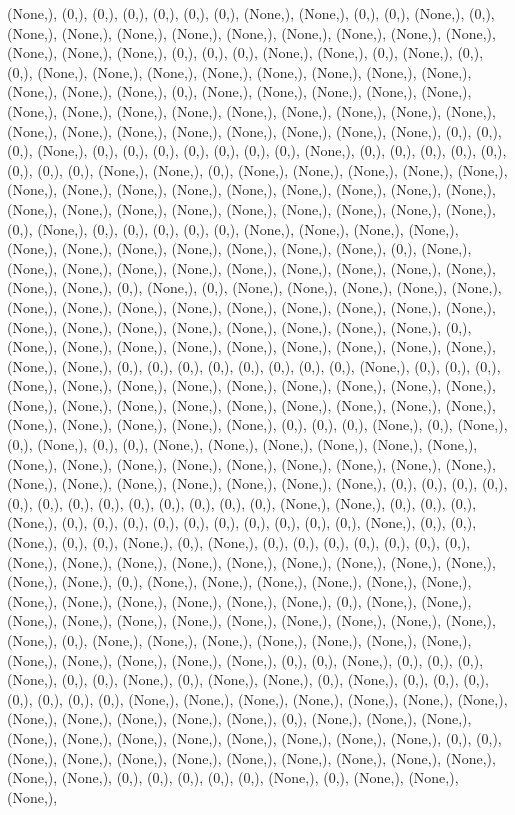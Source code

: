 \documentclass{article}
\begin{document}
(None,), (0,), (0,), (0,), (0,), (0,), (0,), (None,), (None,), (0,), (0,), (None,), (0,), (None,), (None,), (None,), (None,), (None,), (None,), (None,), (None,), (None,), (None,), (None,), (None,), (0,), (0,), (0,), (None,), (None,), (0,), (None,), (0,), (0,), (None,), (None,), (None,), (None,), (None,), (None,), (None,), (None,), (None,), (None,), (None,), (0,), (None,), (None,), (None,), (None,), (None,), (None,), (None,), (None,), (None,), (None,), (None,), (None,), (None,), (None,), (None,), (None,), (None,), (None,), (None,), (None,), (None,), (None,), (0,), (0,), (0,), (None,), (0,), (0,), (0,), (0,), (0,), (0,), (0,), (None,), (0,), (0,), (0,), (0,), (0,), (0,), (0,), (0,), (None,), (None,), (0,), (None,), (None,), (None,), (None,), (None,), (None,), (None,), (None,), (None,), (None,), (None,), (None,), (None,), (None,), (None,), (None,), (None,), (None,), (None,), (None,), (None,), (None,), (None,), (0,), (None,), (0,), (0,), (0,), (0,), (0,), (None,), (None,), (None,), (None,), (None,), (None,), (None,), (None,), (None,), (None,), (None,), (0,), (None,), (None,), (None,), (None,), (None,), (None,), (None,), (None,), (None,), (None,), (None,), (None,), (0,), (None,), (0,), (None,), (None,), (None,), (None,), (None,), (None,), (None,), (None,), (None,), (None,), (None,), (None,), (None,), (None,), (None,), (None,), (None,), (None,), (None,), (None,), (None,), (None,), (0,), (None,), (None,), (None,), (None,), (None,), (None,), (None,), (None,), (None,), (None,), (None,), (0,), (0,), (0,), (0,), (0,), (0,), (0,), (0,), (None,), (0,), (0,), (0,), (None,), (None,), (None,), (None,), (None,), (None,), (None,), (None,), (None,), (None,), (None,), (None,), (None,), (None,), (None,), (None,), (None,), (None,), (None,), (None,), (None,), (None,), (None,), (0,), (0,), (0,), (None,), (0,), (None,), (0,), (None,), (0,), (0,), (None,), (None,), (None,), (None,), (None,), (None,), (None,), (None,), (None,), (None,), (None,), (None,), (None,), (None,), (None,), (None,), (None,), (None,), (None,), (None,), (None,), (None,), (0,), (0,), (0,), (0,), (0,), (0,), (0,), (0,), (0,), (0,), (0,), (0,), (0,), (None,), (None,), (0,), (0,), (0,), (None,), (0,), (0,), (0,), (0,), (0,), (0,), (0,), (0,), (0,), (0,), (None,), (0,), (0,), (None,), (0,), (0,), (None,), (0,), (None,), (0,), (0,), (0,), (0,), (0,), (0,), (0,), (None,), (None,), (None,), (None,), (None,), (None,), (None,), (None,), (None,), (None,), (None,), (0,), (None,), (None,), (None,), (None,), (None,), (None,), (None,), (None,), (None,), (None,), (None,), (None,), (0,), (None,), (None,), (None,), (None,), (None,), (None,), (None,), (None,), (None,), (None,), (None,), (None,), (0,), (None,), (None,), (None,), (None,), (None,), (None,), (None,), (None,), (None,), (None,), (None,), (None,), (0,), (0,), (None,), (0,), (0,), (0,), (None,), (0,), (0,), (None,), (0,), (None,), (None,), (0,), (None,), (0,), (0,), (0,), (0,), (0,), (0,), (0,), (None,), (None,), (None,), (None,), (None,), (None,), (None,), (None,), (None,), (None,), (None,), (None,), (0,), (None,), (None,), (None,), (None,), (None,), (None,), (None,), (None,), (None,), (None,), (None,), (0,), (0,), (None,), (None,), (None,), (None,), (None,), (None,), (None,), (None,), (None,), (None,), (None,), (0,), (0,), (0,), (0,), (0,), (None,), (0,), (None,), (None,), (None,), 
\end{document}
